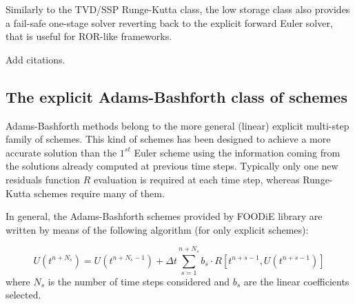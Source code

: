 \documentclass[pdftex,preprint,3p,times,numbers]{elsarticle}
\begin{document}
\begin{table}[!ht]
  \centering
  \caption{Williamson's table of 7 stages, $4^{th}$ order, Runge-Kutta low storage scheme\label{tab:RK-ls-7}}
\end{table}

Similarly to the TVD/SSP Runge-Kutta class, the low storage class also provides a fail-safe one-stage solver reverting back to the explicit forward Euler solver, that is useful for ROR-like frameworks.

{\color{red} Add citations.}

\subsection{The explicit Adams-Bashforth class of schemes}

Adams-Bashforth methods belong to the more general (linear) explicit multi-step family of schemes. This kind of schemes has been designed to achieve a more accurate solution than the $1^{st}$ Euler scheme using the information coming from the solutions already computed at previous time steps. Typically only one new residuals function $R$ evaluation is required at each time step, whereas Runge-Kutta schemes require many of them.

In general, the Adams-Bashforth schemes provided by FOODiE library are written by means of the following algorithm (for only explicit schemes):

\begin{equation}
U\left(t^{n+N_s}\right) = U\left(t^{n+N_s-1}\right) +\Delta t \sum_{s=1}^{n+N_s}{ b_s \cdot R\left[t^{n+s-1}, U\left(t^{n+s-1}\right)\right]}
\label{eq:AB}
\end{equation}
where $N_s$ is the number of time steps considered and $b_s$ are the linear coefficients selected.
\end{document}
